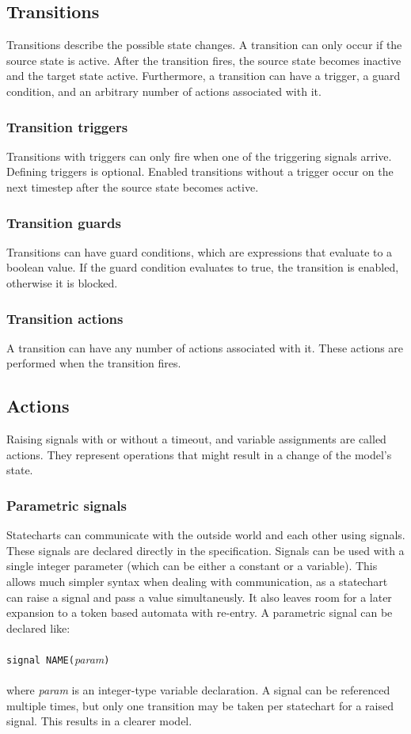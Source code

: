   \subsection{Transitions}
Transitions describe the possible state changes. A transition can only occur if the source state is active. After the transition fires, the source state becomes inactive and the target state active. Furthermore, a transition can have a trigger, a guard condition, and an arbitrary number of actions associated with it.
    \subsubsection{Transition triggers}
Transitions with triggers can only fire when one of the triggering signals arrive. Defining triggers is optional. Enabled transitions without a trigger occur on the next timestep after the source state becomes active.
    \subsubsection{Transition guards}
Transitions can have guard conditions, which are expressions that evaluate to a boolean value. If the guard condition evaluates to true, the transition is enabled, otherwise it is blocked.
    \subsubsection{Transition actions}
A transition can have any number of actions associated with it. These actions are performed when the transition fires.
  \subsection{Actions}
Raising signals with or without a timeout, and variable assignments are called actions. They represent operations that might result in a change of the model's state.
  \subsubsection{Parametric signals}
Statecharts can communicate with the outside world and each other using signals. These signals are declared directly in the specification. Signals can be used with a single integer parameter (which can be either a constant or a variable). This allows much simpler syntax when dealing with communication, as a statechart can raise a signal and pass a value simultaneusly. It also leaves room for a later expansion to a token based automata with re-entry.
A parametric signal can be declared like:
\\\\\verb!signal NAME(!\textit{param}\verb!)!\\\\
where \textit{param} is an integer-type variable declaration. A signal can be referenced multiple times, but only one transition may be taken per statechart for a raised signal. This results in a clearer model.
